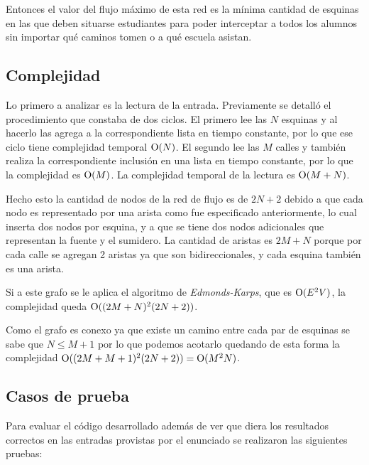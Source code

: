 Entonces el valor del flujo máximo de esta red es la mínima cantidad de
esquinas en las que deben situarse estudiantes para poder interceptar a todos
los alumnos sin importar qué caminos tomen o a qué escuela asistan.

\subsection{Complejidad}

Lo primero a analizar es la lectura de la entrada. Previamente se detalló el
procedimiento que constaba de dos ciclos. El primero lee las $N$ esquinas y al
hacerlo las agrega a la correspondiente lista en tiempo constante, por lo que
ese ciclo tiene complejidad temporal $\operatorname{O}(N)$. El segundo lee las $M$ calles
y también realiza la correspondiente inclusión en una lista en tiempo
constante, por lo que la complejidad es $\operatorname{O}(M)$. La complejidad temporal de
la lectura es $\operatorname{O}(M + N)$.

Hecho esto la cantidad de nodos de la red de flujo es de $2N + 2$ debido a que
cada nodo es representado por una arista como fue especificado anteriormente,
lo cual inserta dos nodos por esquina, y a que se tiene dos nodos adicionales
que representan la fuente y el sumidero. La cantidad de aristas es $2M + N$
porque por cada calle se agregan 2 aristas ya que son bidireccionales, y cada
esquina también es una arista.

Si a este grafo se le aplica el algoritmo de \textit{Edmonds-Karps}, que es
$\operatorname{O}(E^2V)$, la complejidad queda $\operatorname{O}((2M + N)^2(2N + 2))$.

Como el grafo es conexo ya que existe un camino entre cada par de esquinas se
sabe que $N \leq M + 1$ por lo que podemos acotarlo quedando de esta forma la
complejidad $\operatorname{O}((2M + M + 1)^2(2N + 2)) = \operatorname{O}(M^2N)$.

\subsection{Casos de prueba}

Para evaluar el código desarrollado además de ver que diera los resultados
correctos en las entradas provistas por el enunciado se realizaron las
siguientes pruebas:

